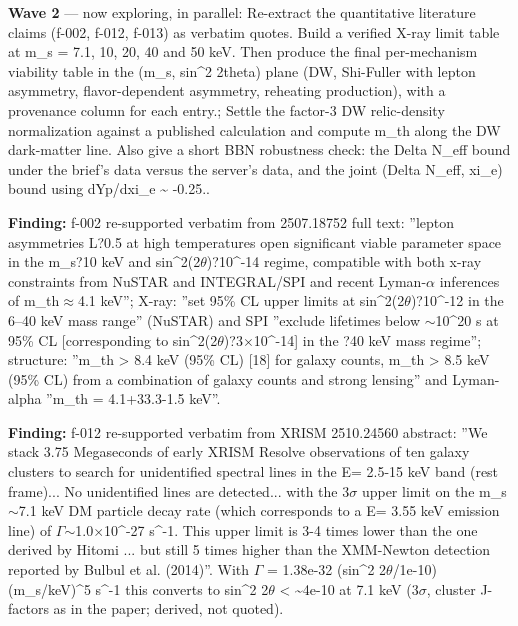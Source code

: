 \documentclass[11pt,a4paper]{article}
\begin{document}
\textbf{Wave 2} --- now exploring, in parallel: Re-extract the quantitative literature claims (f-002, f-012, f-013) as verbatim quotes. Build a verified X-ray limit table at m\_s = 7.1, 10, 20, 40 and 50 keV. Then produce the final per-mechanism viability table in the (m\_s, sin\textasciicircum{}2 2theta) plane (DW, Shi-Fuller with lepton asymmetry, flavor-dependent asymmetry, reheating production), with a provenance column for each entry.; Settle the factor-3 DW relic-density normalization against a published calculation and compute m\_th along the DW dark-matter line. Also give a short BBN robustness check: the Delta N\_eff bound under the brief's data versus the server's data, and the joint (Delta N\_eff, xi\_e) bound using dYp/dxi\_e \textasciitilde{} -0.25..

\textbf{Finding:} f-002 re-supported verbatim from 2507.18752 full text: ''lepton asymmetries L?0.5 at high temperatures open significant viable parameter space in the m\_s?10 keV and sin\textasciicircum{}2(2$\theta$)?10\textasciicircum{}-14 regime, compatible with both x-ray constraints from NuSTAR and INTEGRAL/SPI and recent Lyman-$\alpha$ inferences of m\_th$\approx$4.1 keV''; X-ray: ''set 95\% CL upper limits at sin\textasciicircum{}2(2$\theta$)?10\textasciicircum{}-12 in the 6--40 keV mass range'' (NuSTAR) and SPI ''exclude lifetimes below $\sim$10\textasciicircum{}20 s at 95\% CL [corresponding to sin\textasciicircum{}2(2$\theta$)?3$\times$10\textasciicircum{}-14] in the ?40 keV mass regime''; structure: ''m\_th \textgreater{} 8.4 keV (95\% CL) [18] for galaxy counts, m\_th \textgreater{} 8.5 keV (95\% CL) from a combination of galaxy counts and strong lensing'' and Lyman-alpha ''m\_th = 4.1+33.3-1.5 keV''.

\textbf{Finding:} f-012 re-supported verbatim from XRISM 2510.24560 abstract: ''We stack 3.75 Megaseconds of early XRISM Resolve observations of ten galaxy clusters to search for unidentified spectral lines in the E= 2.5-15 keV band (rest frame)... No unidentified lines are detected... with the 3$\sigma$ upper limit on the m\_s$\sim$7.1 keV DM particle decay rate (which corresponds to a E= 3.55 keV emission line) of $\Gamma$$\sim$1.0$\times$10\textasciicircum{}-27 s\textasciicircum{}-1. This upper limit is 3-4 times lower than the one derived by Hitomi ... but still 5 times higher than the XMM-Newton detection reported by Bulbul et al. (2014)''. With $\Gamma$ = 1.38e-32 (sin\textasciicircum{}2 2$\theta$/1e-10)(m\_s/keV)\textasciicircum{}5 s\textasciicircum{}-1 this converts to sin\textasciicircum{}2 2$\theta$ \textless{} \textasciitilde{}4e-10 at 7.1 keV (3$\sigma$, cluster J-factors as in the paper; derived, not quoted).
\end{document}

